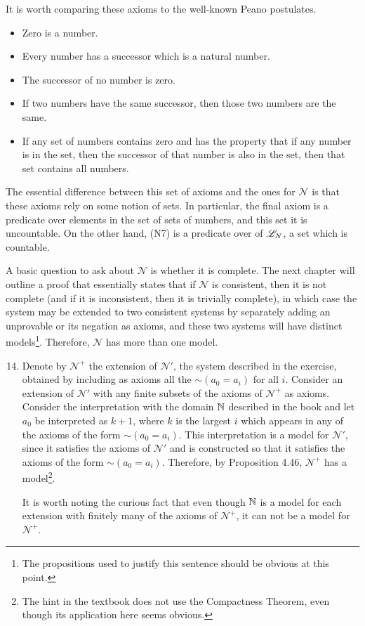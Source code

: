It is worth comparing these axioms to the well-known Peano postulates.
\begin{itemize}
  \item Zero is a number.
  \item Every number has a successor which is a natural number.
  \item The successor of no number is zero.
  \item If two numbers have the same successor, then those two numbers are the same.
  \item If any set of numbers contains zero and has the property that if any number is in the set, then the successor of that number is also in the set, then that set contains all numbers.
\end{itemize}

The essential difference between this set of axioms and the ones for \(\mathcal{N}\) is that these axioms rely on some notion of sets. In particular, the final axiom is a predicate over elements in the set of sets of numbers, and this set it is uncountable. On the other hand, (N7) is a predicate over \wfs{} of \(\mathscr{L}_{N}\), a set which is countable.

A basic question to ask about \(\mathcal{N}\) is whether it is complete. The next chapter will outline a proof that essentially states that if \(\mathcal{N}\) is consistent, then it is not complete (and if it is inconsistent, then it is trivially complete), in which case the system may be extended to two consistent systems by separately adding an unprovable \wf{} or its negation as axioms, and these two systems will have distinct models\footnote{The propositions used to justify this sentence should be obvious at this point.}. Therefore, \(\mathcal{N}\) has more than one model.

\solutions{}
\begin{enumerate}
  \setcounter{enumi}{13}
  \item %
    Denote by \(\mathcal{N}^+\) the extension of \(\mathcal{N}'\), the system described in the exercise, obtained by including as axioms all the \wfs{} \(\sim(a_0 = a_i)\) for all \(i\). Consider an extension of \(\mathcal{N}'\) with any finite subsets of the axioms of \(\mathcal{N}^+\) as axioms. Consider the interpretation with the domain \(\mathbb{N}\) described in the book and let \(a_0\) be interpreted as \(k+1\), where \(k\) is the largest \(i\) which appears in any of the axioms of the form \(\sim(a_0 = a_i)\). This interpretation is a model for \(\mathcal{N}'\), since it satisfies the axioms of \(\mathcal{N}'\) and is constructed so that it satisfies the axioms of the form \(\sim(a_0 = a_i)\). Therefore, by Proposition 4.46, \(\mathcal{N}^+\) has a model\footnote{The hint in the textbook does not use the Compactness Theorem, even though its application here seems obvious.}.

    It is worth noting the curious fact that even though \(\mathbb{N}\) is a model for each extension with finitely many of the axioms of \(\mathcal{N}^+\), it can not be a model for \(\mathcal{N}^+\).
\end{enumerate}

